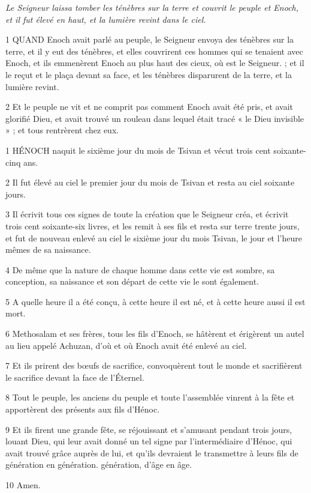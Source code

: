 
\par \textit{Le Seigneur laissa tomber les ténèbres sur la terre et couvrit le peuple et Enoch, et il fut élevé en haut, et la lumière revint dans le ciel.}

\par 1 QUAND Enoch avait parlé au peuple, le Seigneur envoya des ténèbres sur la terre, et il y eut des ténèbres, et elles couvrirent ces hommes qui se tenaient avec Enoch, et ils emmenèrent Enoch au plus haut des cieux, où est le Seigneur. ; et il le reçut et le plaça devant sa face, et les ténèbres disparurent de la terre, et la lumière revint.

\par 2 Et le peuple ne vit et ne comprit pas comment Enoch avait été pris, et avait glorifié Dieu, et avait trouvé un rouleau dans lequel était tracé « le Dieu invisible » ; et tous rentrèrent chez eux.


\par 1 HÉNOCH naquit le sixième jour du mois de Tsivan et vécut trois cent soixante-cinq ans.

\par 2 Il fut élevé au ciel le premier jour du mois de Tsivan et resta au ciel soixante jours.

\par 3 Il écrivit tous ces signes de toute la création que le Seigneur créa, et écrivit trois cent soixante-six livres, et les remit à ses fils et resta sur terre trente jours, et fut de nouveau enlevé au ciel le sixième jour du mois Tsivan, le jour et l'heure mêmes de sa naissance.

\par 4 De même que la nature de chaque homme dans cette vie est sombre, sa conception, sa naissance et son départ de cette vie le sont également.

\par 5 A quelle heure il a été conçu, à cette heure il est né, et à cette heure aussi il est mort.

\par 6 Methosalam et ses frères, tous les fils d'Enoch, se hâtèrent et érigèrent un autel au lieu appelé Achuzan, d'où et où Enoch avait été enlevé au ciel.

\par 7 Et ils prirent des bœufs de sacrifice, convoquèrent tout le monde et sacrifièrent le sacrifice devant la face de l'Éternel.

\par 8 Tout le peuple, les anciens du peuple et toute l'assemblée vinrent à la fête et apportèrent des présents aux fils d'Hénoc.

\par 9 Et ils firent une grande fête, se réjouissant et s'amusant pendant trois jours, louant Dieu, qui leur avait donné un tel signe par l'intermédiaire d'Hénoc, qui avait trouvé grâce auprès de lui, et qu'ils devraient le transmettre à leurs fils de génération en génération. génération, d’âge en âge.

\par 10 Amen.



